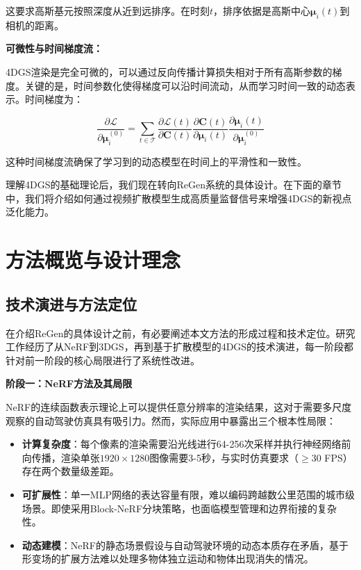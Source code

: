 这要求高斯基元按照深度从近到远排序。在时刻$t$，排序依据是高斯中心$\boldsymbol{\mu}_i(t)$到相机的距离。

\textbf{可微性与时间梯度流：}

4DGS渲染是完全可微的，可以通过反向传播计算损失相对于所有高斯参数的梯度。关键的是，时间参数化使得梯度可以沿时间流动，从而学习时间一致的动态表示。时间梯度为：

\begin{equation}
\frac{\partial \mathcal{L}}{\partial \boldsymbol{\mu}_i^{(0)}} = \sum_{t \in \mathcal{T}} \frac{\partial \mathcal{L}(t)}{\partial \mathbf{C}(t)} \frac{\partial \mathbf{C}(t)}{\partial \boldsymbol{\mu}_i(t)} \frac{\partial \boldsymbol{\mu}_i(t)}{\partial \boldsymbol{\mu}_i^{(0)}}
\label{eq:temporal_gradient}
\end{equation}

这种时间梯度流确保了学习到的动态模型在时间上的平滑性和一致性。

理解4DGS的基础理论后，我们现在转向ReGen系统的具体设计。在下面的章节中，我们将介绍如何通过视频扩散模型生成高质量监督信号来增强4DGS的新视点泛化能力。

\section{方法概览与设计理念}
\label{sec:method_overview}

\subsection{技术演进与方法定位}

在介绍ReGen的具体设计之前，有必要阐述本文方法的形成过程和技术定位。研究工作经历了从NeRF到3DGS，再到基于扩散模型的4DGS的技术演进，每一阶段都针对前一阶段的核心局限进行了系统性改进。

\textbf{阶段一：NeRF方法及其局限}

NeRF的连续函数表示理论上可以提供任意分辨率的渲染结果，这对于需要多尺度观察的自动驾驶仿真具有吸引力。然而，实际应用中暴露出三个根本性局限：

\begin{itemize}
\item \textbf{计算复杂度}：每个像素的渲染需要沿光线进行64-256次采样并执行神经网络前向传播，渲染单张$1920 \times 1280$图像需要3-5秒，与实时仿真要求（$\geq$30 FPS）存在两个数量级差距。
\item \textbf{可扩展性}：单一MLP网络的表达容量有限，难以编码跨越数公里范围的城市级场景。即使采用Block-NeRF分块策略，也面临模型管理和边界衔接的复杂性。
\item \textbf{动态建模}：NeRF的静态场景假设与自动驾驶环境的动态本质存在矛盾，基于形变场的扩展方法难以处理多物体独立运动和物体出现消失的情况。
\end{itemize}


